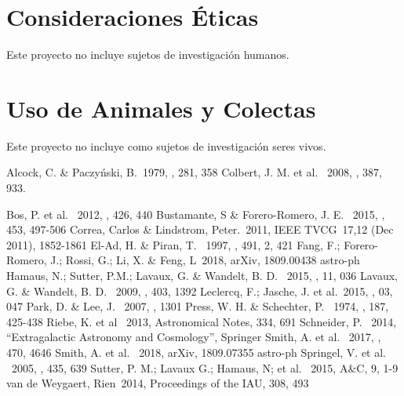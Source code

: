 \documentclass[manuscript]{aastex62}
\begin{document}
\section{Consideraciones Éticas}
Este proyecto no incluye sujetos de investigación humanos.

\section{Uso de Animales y Colectas}
Este proyecto no incluye como sujetos de investigación seres vivos.

  \nocite{*}

  \begin{thebibliography}{}

   Alcock, C. \& Paczy\'nski, B.\ 1979, \nat, 281, 358    
     Colbert, J. M. et al. \ 2008, \mnras, 387, 933. %

     Bos, P. et al. \ 2012, \mnras, 426, 440 %
     Bustamante, S \& Forero-Romero, J. E. \ 2015, \mnras, 453, 497-506
     Correa, Carlos \& Lindstrom, Peter.\ 2011,  IEEE TVCG\ 17,12 (Dec 2011), 1852-1861
     El-Ad, H. \& Piran, T. \ 1997, \apj, 491, 2, 421
     Fang, F.; Forero-Romero, J.; Rossi, G.; Li, X. \& Feng, L\ 2018, arXiv, 1809.00438 astro-ph %
     Hamaus, N.; Sutter, P.M.; Lavaux, G. \& Wandelt, B. D. \ 2015, \jcap, 11, 036    
     Lavaux, G. \& Wandelt, B. D. \ 2009, \mnras, 403, 1392
     Leclercq, F.; Jasche, J. et al.\ 2015, \jcap, 03, 047
     Park, D. \& Lee, J. \ 2007, , 1301 %
     Press, W. H. \& Schechter, P. \ 1974, \apj, 187, 425-438
     Riebe, K. et al \ 2013, Astronomical Notes, 334, 691 %
     Schneider, P. \ 2014, ``Extragalactic Astronomy and Cosmology'', Springer
     Smith, A. et al. \ 2017, \mnras, 470, 4646 %
     Smith, A. et al. \ 2018, arXiv, 1809.07355 astro-ph %
     Springel, V. et al. \ 2005, \nat, 435, 639 %
     Sutter, P. M.; Lavaux G.; Hamaus, N; et al. \ 2015, A\&C, 9, 1-9 %
     van de Weygaert, Rien\ 2014, Proceedings of the IAU, 308, 493 %


\end{thebibliography}
\end{document}
